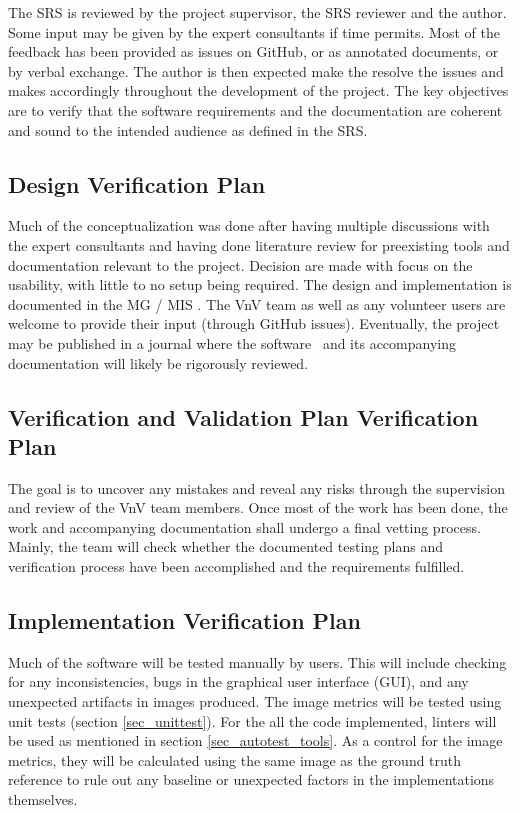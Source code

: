 \documentclass[12pt, titlepage]{article}
\begin{document}
The SRS is reviewed by the project supervisor, the SRS reviewer and the author. Some input
may be given by the expert consultants if time permits. Most of the feedback has been provided 
as issues on GitHub, or as annotated documents, or by verbal exchange. The author is then expected
make the resolve the issues and makes accordingly throughout the development of the project.
The key objectives are to verify that the software requirements and the documentation are coherent
and sound to the intended audience as defined in the SRS.


\subsection{Design Verification Plan}

Much of the conceptualization was done after having multiple discussions with the expert 
consultants and having done literature review for preexisting tools and documentation 
relevant to the project. Decision are made with focus on the usability, with little to 
no setup being required. The design and implementation is documented in the 
MG / MIS \citep{MG,MIS}.
The VnV team as well as any volunteer users are welcome to provide
their input (through GitHub issues). Eventually, the project may be published in a journal
where the software \progname~and its accompanying documentation will 
likely be rigorously reviewed.



\subsection{Verification and Validation Plan Verification Plan}

The goal is to uncover any mistakes and reveal any risks through the supervision and 
review of the VnV team members. Once most of the work has been done, the work and
accompanying documentation shall undergo a final vetting process. Mainly, the team
will check whether the documented testing plans and verification process have been 
accomplished and the requirements fulfilled.


\subsection{Implementation Verification Plan}

Much of the software will be tested manually by users. This will include checking for
any inconsistencies, bugs in the graphical user interface (GUI), and any unexpected
artifacts in images produced.
The image metrics will be tested using unit tests (section \ref{sec_unittest}). For the
all the code implemented, linters will be used as mentioned in section \ref{sec_autotest_tools}.
As a control for the image metrics, they will be calculated using the same image as the ground truth 
reference to rule out any baseline or unexpected factors in the implementations themselves.
\end{document}
